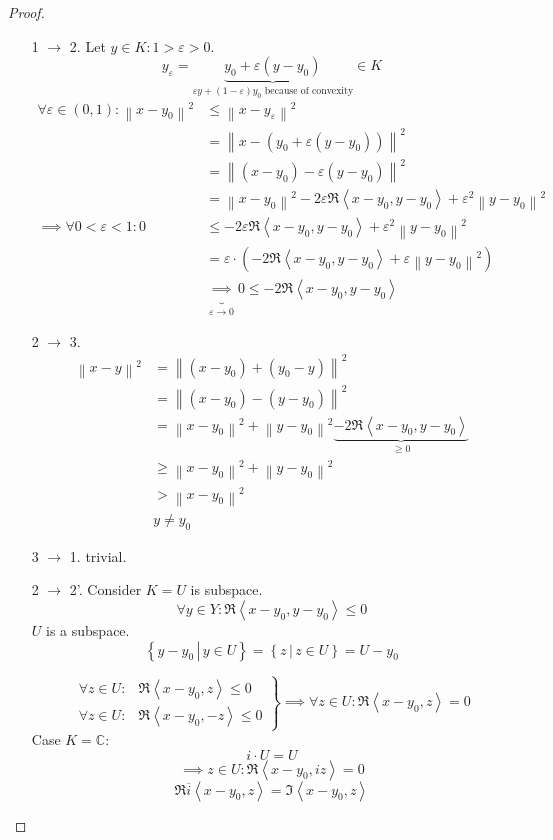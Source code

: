 \documentclass[a4paper]{article}
\numberwithin{lecref}{section}
\newcommand{\setdef}[2]{\left\{\left.#1\,\right|\,#2\right\}}
\newcommand{\ip}[2]{\left\langle#1,#2\right\rangle} %
\newcommand{\norm}[1]{\left\|#1\right\|}
\begin{document}
\begin{proof} \hfill{}
  \begin{enumerate}
    \item[1 $\to$ 2.]
      Let $y \in K: 1 > \varepsilon > 0$.
      \[ y_\varepsilon = \underbrace{y_0 + \varepsilon(y - y_0)}_{\varepsilon y + (1 - \varepsilon) y_0 \text{ because of convexity}} \in K \]
      \begin{align*}
        \forall \varepsilon \in (0,1): \norm{x - y_0}^2
          &\leq \norm{x - y_{\varepsilon}}^2 \\
          &= \norm{x - (y_0 + \varepsilon (y - y_0))}^2 \\
          &= \norm{(x - y_0) - \varepsilon(y - y_0)}^2 \\
          &= \norm{x - y_0}^2 - 2\varepsilon\Re\ip{x - y_0}{y - y_0} + \varepsilon^2 \norm{y - y_0}^2 \\
       \implies \forall 0 < \varepsilon < 1: 0
          &\leq -2\varepsilon \Re\ip{x - y_0}{y - y_0} + \varepsilon^2 \norm{y - y_0}^2 \\
          &= \varepsilon \cdot \left(- 2\Re\ip{x - y_0}{y - y_0} + \varepsilon \norm{y - y_0}^2\right) \\
          &\underbrace{\implies}_{\varepsilon \to 0} 0 \leq - 2\Re\ip{x - y_0}{y - y_0}
      \end{align*}
    \item[2 $\to$ 3.]
      \begin{align*}
        \norm{x - y}^2 &= \norm{(x - y_0) + (y_0 - y)}^2 \\
          &= \norm{(x - y_0) - (y - y_0)}^2 \\
          &= \norm{x - y_0}^2 + \norm{y - y_0}^2 \underbrace{- 2\Re\ip{x - y_0}{y - y_0}}_{\geq 0} \\
          &\geq \norm{x - y_0}^2 + \norm{y - y_0}^2 \\
          &> \norm{x - y_0}^2 \\
          & y \neq y_0
      \end{align*}
    \item[3 $\to$ 1.]
      trivial.
    \item[2 $\to$ 2'.]
      Consider $K = U$ is subspace.
      \[ \forall y \in Y: \Re\ip{x - y_0}{y - y_0} \leq 0 \]
      $U$ is a subspace.
      \[ \setdef{y - y_0}{y \in U} = \setdef{z}{z \in U} = U - y_0 \]

      \[
        \left.
        \begin{array}{ll}
          \forall z \in U: &\Re\ip{x - y_0}{z} \leq 0 \\
          \forall z \in U: &\Re\ip{x - y_0}{-z} \leq 0
        \end{array}
        \right\}
        \implies \forall z \in U: \Re\ip{x - y_0}{z} = 0
      \]
      Case $K = \mathbb C$:
      \[ i \cdot U = U \]
      \[ \implies z \in U: \Re\ip{x - y_0}{iz} = 0 \]
      \[ \Re\overline{i}\ip{x - y_0}{z} = \Im\ip{x - y_0}{z} \]
  \end{enumerate}
\end{proof}
\end{document}
